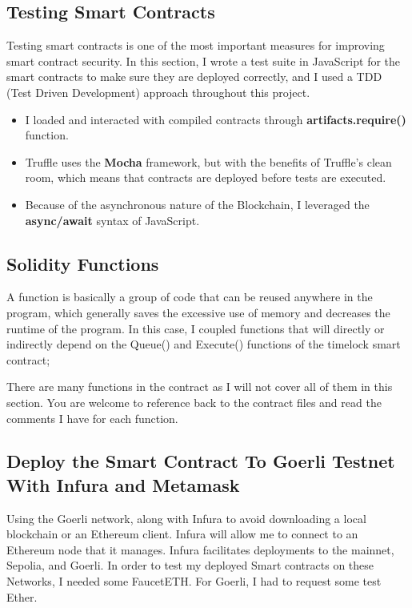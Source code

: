 \documentclass[10pt,twocolumn]{article}
\begin{document}
\subsection{Testing Smart Contracts}
Testing smart contracts is one of the most important measures for improving smart contract security. In this section, I wrote a test suite in JavaScript for the smart contracts to make sure they are deployed correctly, and I used a TDD (Test Driven Development) approach throughout this project.
\begin{itemize}
    \item I loaded and interacted with compiled contracts through \textbf{artifacts.require()} function.
    \item Truffle uses the \textbf{Mocha} framework, but with the benefits of Truffle’s clean room, which means that contracts are deployed before tests are executed.
    \item Because of the asynchronous nature of the Blockchain, I leveraged the \textbf{async/await} syntax of JavaScript.
\end{itemize}
\subsection{Solidity Functions}
A function is basically a group of code that can be reused anywhere in the program, which generally saves the excessive use of memory and decreases the runtime of the program.
In this case, I coupled functions that will directly or indirectly depend on the Queue() and Execute() functions of the timelock smart contract;

There are many functions in the contract as I will not cover all of them in this section. 
You are welcome to reference back to the contract files and read the comments I have for each function.
\subsection{Deploy the Smart Contract To Goerli Testnet With Infura and Metamask}
Using the Goerli network, along with Infura to avoid downloading a local blockchain or an Ethereum client. Infura will allow me to connect to an Ethereum node that it manages. Infura facilitates deployments to the mainnet, Sepolia, and Goerli.
In order to test my deployed Smart contracts on these Networks, I needed some FaucetETH. For Goerli, I had to request some test Ether. 
\end{document}
